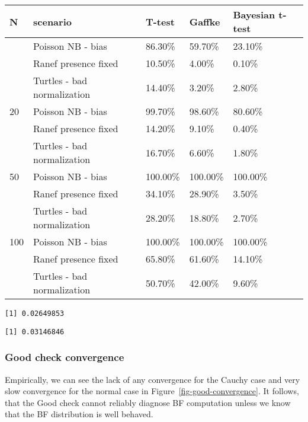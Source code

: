 \documentclass[
  letterpaper,
  DIV=11,
  numbers=noendperiod]{scrartcl}
\begin{document}
\begin{longtable}[]{@{}lllll@{}}
\toprule\noalign{}
N & scenario & T-test & Gaffke & Bayesian t-test \\
\midrule\noalign{}
\endhead
\bottomrule\noalign{}
\endlastfoot
10 & Poisson NB - bias & 86.30\% & 59.70\% & 23.10\% \\
& Ranef presence fixed & 10.50\% & 4.00\% & 0.10\% \\
& Turtles - bad normalization & 14.40\% & 3.20\% & 2.80\% \\
20 & Poisson NB - bias & 99.70\% & 98.60\% & 80.60\% \\
& Ranef presence fixed & 14.20\% & 9.10\% & 0.40\% \\
& Turtles - bad normalization & 16.70\% & 6.60\% & 1.80\% \\
50 & Poisson NB - bias & 100.00\% & 100.00\% & 100.00\% \\
& Ranef presence fixed & 34.10\% & 28.90\% & 3.50\% \\
& Turtles - bad normalization & 28.20\% & 18.80\% & 2.70\% \\
100 & Poisson NB - bias & 100.00\% & 100.00\% & 100.00\% \\
& Ranef presence fixed & 65.80\% & 61.60\% & 14.10\% \\
& Turtles - bad normalization & 50.70\% & 42.00\% & 9.60\% \\
\end{longtable}

\begin{verbatim}
[1] 0.02649853
\end{verbatim}

\begin{verbatim}
[1] 0.03146846
\end{verbatim}

\subsubsection{Good check convergence}\label{good-check-convergence}

Empirically, we can see the lack of any convergence for the Cauchy case
and very slow convergence for the normal case in
Figure~\ref{fig-good-convergence}. It follows, that the Good check
cannot reliably diagnose BF computation unless we know that the BF
distribution is well behaved.
\end{document}
